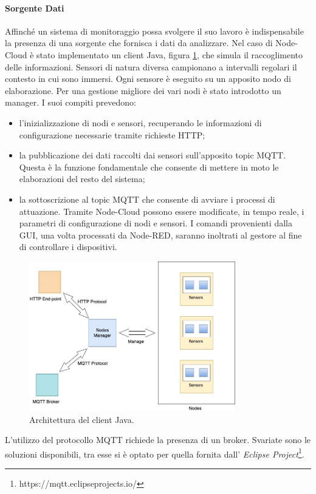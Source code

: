 \documentclass{article}
\begin{document}
\paragraph{Sorgente Dati}
Affinché un sistema di monitoraggio possa svolgere il suo lavoro è indispensabile la presenza di una sorgente che fornisca i dati da analizzare. Nel caso di Node-Cloud è stato implementato un client Java, figura \ref{fig:java-client-architecture}, che simula il raccoglimento delle informazioni. Sensori di natura diversa campionano a intervalli regolari il contesto in cui sono immersi. Ogni sensore è eseguito su un apposito nodo di elaborazione. Per una gestione migliore dei vari nodi è stato introdotto un manager. I suoi compiti prevedono:
\begin{itemize}
    \item l’inizializzazione di nodi e sensori, recuperando le informazioni di configurazione necessarie tramite richieste HTTP;
    \item la pubblicazione dei dati raccolti dai sensori sull’apposito topic MQTT. Questa è la funzione fondamentale che consente di mettere in moto le elaborazioni del resto del sistema;
    \item la sottoscrizione al topic MQTT che consente di avviare i processi di attuazione. Tramite Node-Cloud possono essere modificate, in tempo reale, i parametri di configurazione di nodi e sensori. I comandi provenienti dalla GUI, una volta processati da Node-RED, saranno inoltrati al gestore al fine di controllare i dispositivi.
\end{itemize}
\begin{figure}[htb]
    \centering
    \includegraphics[width=0.80\textwidth]{java client.jpeg}
    \caption{Architettura del client Java.}
    \label{fig:java-client-architecture}
\end{figure}
L’utilizzo del protocollo MQTT richiede la presenza di un broker. Svariate sono le soluzioni disponibili, tra esse si è optato per quella fornita dall’ \emph{Eclipse Project}\footnote{https://mqtt.eclipseprojects.io/}.
\end{document}
